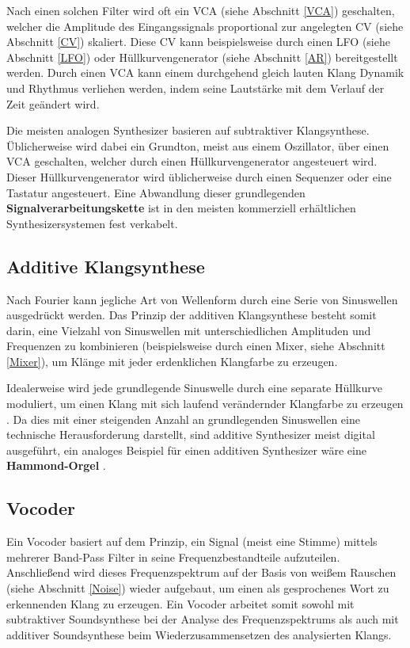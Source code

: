 Nach einen solchen Filter wird oft ein \ac{VCA} (siehe Abschnitt \ref{VCA}) geschalten, welcher die Amplitude des Eingangssignals proportional zur angelegten \acl{CV} (siehe Abschnitt \ref{CV}) skaliert. Diese \acl{CV} kann beispielsweise durch einen \ac{LFO} (siehe Abschnitt \ref{LFO}) oder Hüllkurvengenerator (siehe Abschnitt \ref{AR}) bereitgestellt werden. Durch einen \ac{VCA} kann einem durchgehend gleich lauten Klang Dynamik und Rhythmus verliehen werden, indem seine Lautstärke mit dem Verlauf der Zeit geändert wird.

Die meisten analogen Synthesizer basieren auf subtraktiver Klangsynthese. Üblicherweise wird dabei ein Grundton, meist aus einem Oszillator, über einen \ac{VCA} geschalten, welcher durch einen Hüllkurvengenerator angesteuert wird. Dieser Hüllkurvengenerator wird üblicherweise durch einen Sequenzer oder eine Tastatur angesteuert. Eine Abwandlung dieser grundlegenden \textbf{Signalverarbeitungskette} ist in den meisten kommerziell erhältlichen Synthesizersystemen fest verkabelt.

\subsection{Additive Klangsynthese}
\label{sec:orgbc31c0d}
Nach Fourier kann jegliche Art von Wellenform durch eine Serie von Sinuswellen ausgedrückt werden. Das Prinzip der additiven Klangsynthese besteht somit darin, eine Vielzahl von Sinuswellen mit unterschiedlichen Amplituden und Frequenzen zu kombinieren \cite{soundtraining:synthesis} (beispielsweise durch einen Mixer, siehe Abschnitt \ref{Mixer}), um Klänge mit jeder erdenklichen Klangfarbe zu erzeugen.

\pagebreak

Idealerweise wird jede grundlegende Sinuswelle durch eine separate Hüllkurve moduliert, um einen Klang mit sich laufend verändernder Klangfarbe zu erzeugen \cite{raffaseder}. Da dies mit einer steigenden Anzahl an grundlegenden Sinuswellen eine technische Herausforderung darstellt, sind additive Synthesizer meist digital ausgeführt, ein analoges Beispiel für einen additiven Synthesizer wäre eine \textbf{Hammond-Orgel} \cite{delamar:synthesis}.

\subsection{Vocoder}
\label{sec:orgb404608}
Ein Vocoder basiert auf dem Prinzip, ein Signal (meist eine Stimme) mittels mehrerer Band-Pass Filter in seine Frequenzbestandteile aufzuteilen. Anschließend wird dieses Frequenzspektrum auf der Basis von weißem Rauschen (siehe Abschnitt \ref{Noise}) wieder aufgebaut, um einen als gesprochenes Wort zu erkennenden Klang zu erzeugen. Ein Vocoder arbeitet somit sowohl mit subtraktiver Soundsynthese bei der Analyse des Frequenzspektrums als auch mit additiver Soundsynthese beim Wiederzusammensetzen des analysierten Klangs.

